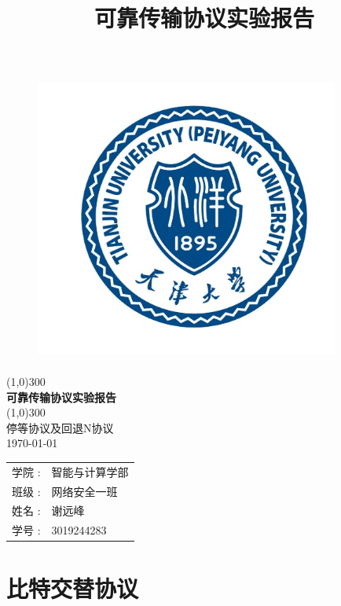 \documentclass[UTF8,14pt]{article}
\title{可靠传输协议实验报告}
\numberwithin{figure}{section}
\begin{document}
\begin{titlepage}
      \begin{center}
            \begin{figure}[ht]
                  \centering
                  \includegraphics[width=10cm,height=9.5cm]{封面.png}
            \end{figure}
            \line(1,0){300}\\
            [0.65cm]
            \Huge{\bfseries 可靠传输协议实验报告 }\\
            \line(1,0){300}\\
            \huge {停等协议及回退N协议\\
                  \today}\\
            [3.5cm]
            \LARGE{
                  \begin{tabular}{rl}
                        学院 :        & 智能与计算学部 \\
                        班级 :        & 网络安全一班   \\
                        姓名        : & 谢远峰         \\
                        学号       :  & 3019244283
                  \end{tabular}
            }
      \end{center}

\end{titlepage}
\clearpage

\section{比特交替协议}
\end{document}
